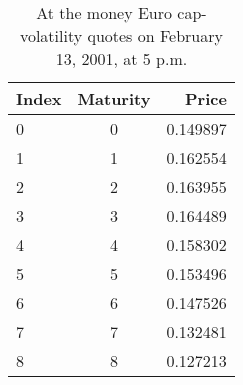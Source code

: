 \begin{table}[H]
    \centering
\begin{tabular}{|l|c|r|}
  \hline
  Index&Maturity&Price \\
  \hline
0&0&0.149897\\
1&1&0.162554\\
2&2&0.163955\\
3&3&0.164489\\
4&4&0.158302\\
5&5&0.153496\\
6&6&0.147526\\
7&7&0.132481\\
8&8&0.127213\\
  \hline
\end{tabular}
\caption{At the money Euro cap-volatility quotes on February 13, 2001, at 5 p.m.}
\end{table}
